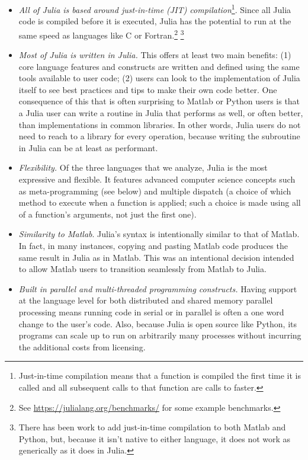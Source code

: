 \begin{itemize}

  \item \textit{All of Julia is based around just-in-time (JIT) compilation}\footnote{Just-in-time
  compilation means that a function is compiled the first time it is called and
  all subsequent calls to that function are calls to faster.}. Since all Julia
  code is compiled before it is executed, Julia has the potential to run at the
  same speed as languages like C or Fortran.\footnote{ See
  \url{https://julialang.org/benchmarks/} for some example benchmarks.}
  \footnote{ There has been work to add just-in-time compilation to both Matlab
  and Python, but, because it isn't native to either language, it does not work
  as generically as it does in Julia.}

  \item \textit{Most of Julia is written in Julia.} This offers at least two
  main benefits: (1) core language features and constructs are written and
  defined using the same tools available to user code; (2) users can look to the
  implementation of Julia itself to see best practices and tips to make their
  own code better. One consequence of this that is often surprising to Matlab
  or Python users is that a Julia user can write a routine in Julia that
  performs as well, or often better, than implementations in common libraries.
  In other words, Julia users do not need to reach to a library for every
  operation, because writing the subroutine in Julia can be at least as
  performant.

  \item \textit{Flexibility. }Of the three languages that we analyze, Julia is
  the most expressive and flexible. It features advanced computer science
  concepts such as meta-programming (see below) and multiple dispatch (a choice
  of which method to execute when a function is applied; such a choice is made
  using all of a function's arguments, not just the first one).

  \item \textit{Similarity to Matlab}. Julia's syntax is intentionally similar
  to that of Matlab. In fact, in many instances, copying and pasting Matlab
  code produces the same result in Julia as in Matlab. This was an intentional
  decision intended to allow Matlab users to transition seamlessly from Matlab
  to Julia.

  \item \textit{Built in parallel and multi-threaded programming constructs.}
  Having support at the language level for both distributed and shared memory
  parallel processing means running code in serial or in parallel is often a
  one word change to the user's code. Also, because Julia is open source like
  Python, its programs can scale up to run on arbitrarily many processes
  without incurring the additional costs from licensing.


\end{itemize}
